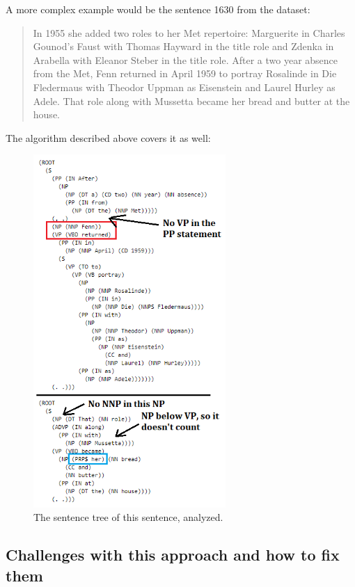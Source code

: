 \documentclass{article}
\begin{document}
A more complex example would be the sentence 1630 from the dataset:
\begin{quote}
    In 1955 she added two roles to her Met repertoire: Marguerite in Charles Gounod's Faust with Thomas Hayward in the title role and Zdenka in Arabella with Eleanor Steber in the title role. After a two year absence from the Met, Fenn returned in April 1959 to portray Rosalinde in Die Fledermaus with Theodor Uppman as Eisenstein and Laurel Hurley as Adele. That role along with Mussetta became her bread and butter at the house.
\end{quote}
The algorithm described above covers it as well:

\begin{figure}[h!]
    \centering
\includegraphics[width=0.65\textwidth]{Example2.png}
    \caption{The sentence tree of this sentence, analyzed.}
\end{figure}


\subsection{Challenges with this approach and how to fix them}
\end{document}
